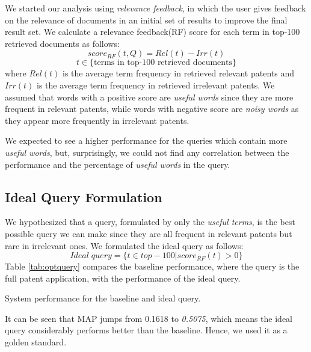 \documentclass{sig-alternate}
\begin{document}
We started our analysis using {\em relevance feedback}, in which the user gives feedback on the relevance of documents in an initial set of results to improve the final result set. We calculate a relevance feedback(RF) score for each term in top-100 retrieved documents as follows:
\begin{equation}
score_{RF}(t,Q)=Rel(t)-Irr(t) 
 \label{eq:score}
\end{equation}\vspace*{-5ex}
\begin{displaymath}t\in \lbrace \mbox{terms in top-100 retrieved documents}\rbrace\end{displaymath}
where $ Rel(t) $ is the average term frequency in retrieved relevant patents and $ Irr(t) $ is the average term frequency in retrieved irrelevant patents. We assumed that words with a positive score are {\em useful words} since they are more frequent in relevant patents, while words with negative score are {\em noisy words} as they appear more frequently in irrelevant patents. 

We expected to see a higher performance for the queries which contain more {\em useful words}, but, surprisingly, we could not find any correlation between the performance and the percentage of {\em useful words} in the query. 

\subsection{Ideal Query Formulation}
We hypothesized that a query, formulated by only the {\em useful terms}, is the best possible query we can make since they are all frequent in relevant patents but rare in irrelevant ones. We formulated the ideal query as follows: 
\begin{equation}
Ideal\; query = \{t \in top-100|score_{RF}(t)>0\}   
 \label{eq:score}
\end{equation}
Table \ref{tab:optquery} compares the baseline performance, where the query is the full patent application, with the performance of the ideal query. 
\begin{table}[htpb]
  \begin{center}
   \caption{System performance for the baseline and ideal query.}
     
  \label{tab:optquery}
  \end{center}  
\end{table}
It can be seen that MAP jumps from 0.1618 to {\em 0.5075}, which means the ideal query considerably performs better than the baseline. Hence, we used it as a golden standard. 
\end{document}

